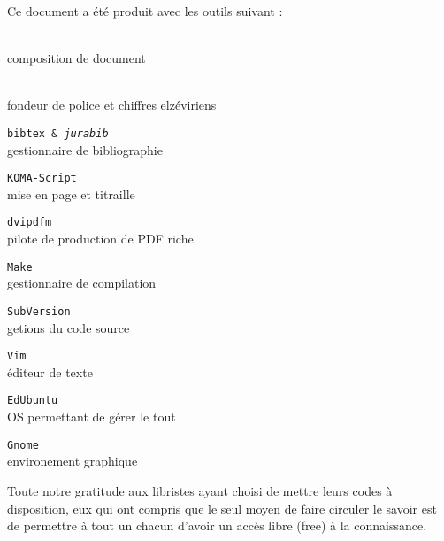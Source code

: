 
\newcommand\colophon[2]{\par\texttt{#1}\\ #2\medskip}

\cleardoublepage
\thispagestyle{empty}
\begin{center}
\small
Ce document a été produit avec les outils suivant :

\begin{multicols}{2}
\par\LaTeXe{}\\ composition de document\medskip
\par\MF{}\\ fondeur de police et chiffres elzéviriens\medskip
\colophon{bibtex \& \emph{jurabib}}{gestionnaire de bibliographie}
\colophon{KOMA-Script}{mise en page et titraille}
\colophon{dvipdfm}{pilote de production de PDF riche}
\colophon{Make}{gestionnaire de compilation}
\colophon{SubVersion}{getions du code source}
\colophon{Vim}{éditeur de texte}
\colophon{EdUbuntu}{OS permettant de gérer le tout}
\colophon{Gnome}{environement graphique}
\end{multicols}

\bigskip

Toute notre gratitude aux libristes ayant choisi de mettre leurs codes à disposition,
eux qui ont compris que le seul moyen de faire circuler le savoir est de permettre
à tout un chacun d'avoir un accès libre (free) à la connaissance.

\bigskip\bigskip

\end{center}

